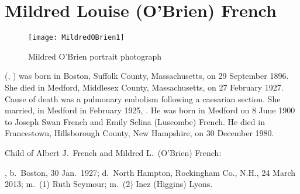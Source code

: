 \section{Mildred Louise (O'Brien) French}\label{per:Mildred4OBrien}

\begin{figure}[htbp]
	\centering
	\texttt{[image: MildredOBrien1]}
	\caption{Mildred O'Brien portrait photograph}
	\label{fig:MildredOBrien}
\end{figure}

 (, ) was born in Boston, Suffolk County, Massachusetts, on 29 September 1896.\cite{Mildred4OBrien2Birth} She died in Medford, Middlesex County, Massachusetts, on 27 February 1927. Cause of death was a pulmonary embolism following a caesarian section.\cite{Mildred4OBrien2Death} She married, in Medford in February 1925, .\cite{Mildred4OBrienMarriage} He was born in Medford on 8 June 1900 to Joseph Swan French and Emily Selina (Luscombe) French.\cite{AlbertFrenchBirth} He died in Francestown, Hillsborough County, New Hampshire, on 30 December 1980.\cite{AlbertFrenchDeath}

\begin{KidsIntro}
	Child of Albert J.\ French and Mildred L.\ (O'Brien) French:
\end{KidsIntro}

\begin{Kids}
	, b.\ Boston, 30 Jan.\ 1927;\cite{Albert5FrenchBirth} d.\ North Hampton, Rockingham Co., N.H., 24 March 2013;\cite{Albert5FrenchDeath:1} m.\ (1) Ruth Seymour;\cite{Albert5FrenchDeath:2} m.\ (2) Inez (Higgins) Lyons.\cite{Albert5FrenchDeath:3}
\end{Kids}